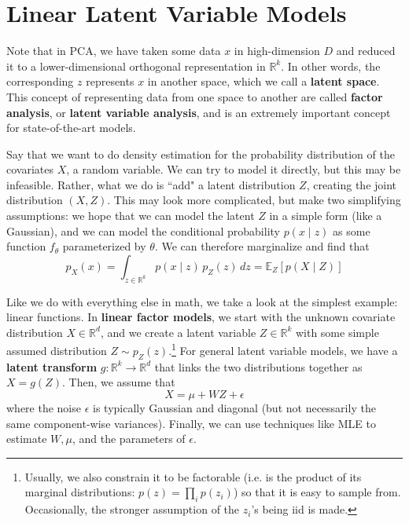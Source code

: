 \section{Linear Latent Variable Models}

  Note that in PCA, we have taken some data $x$ in high-dimension $D$ and reduced it to a lower-dimensional orthogonal representation in $\mathbb{R}^k$. In other words, the corresponding $z$ represents $x$ in another space, which we call a \textbf{latent space}. This concept of representing data from one space to another are called \textbf{factor analysis}, or \textbf{latent variable analysis}, and is an extremely important concept for state-of-the-art models. 

  Say that we want to do density estimation for the probability distribution of the covariates $X$, a random variable. We can try to model it directly, but this may be infeasible. Rather, what we do is ``add" a latent distribution $Z$, creating the joint distribution $(X, Z)$. This may look more complicated, but make two simplifying assumptions: we hope that we can model the latent $Z$ in a simple form (like a Gaussian), and we can model the conditional probability $p(x \mid z)$ as some function $f_\theta$ parameterized by $\theta$. We can therefore marginalize and find that 
  \begin{equation} 
    p_X (x) = \int_{z \in \mathbb{R}^k} p (x \mid z) \, p_Z (z) \,dz = \mathbb{E}_Z [p(X \mid Z)] 
  \end{equation}

  Like we do with everything else in math, we take a look at the simplest example: linear functions. In \textbf{linear factor models}, we start with the unknown covariate distribution $X \in \mathbb{R}^d$, and we create a latent variable $Z \in \mathbb{R}^k$ with some simple assumed distribution $Z \sim p_Z (z)$.\footnote{Usually, we also constrain it to be factorable (i.e. is the product of its marginal distributions: $p(z) = \prod_i p(z_i)$) so that it is easy to sample from. Occasionally, the stronger assumption of the $z_i$'s being iid is made.} For general latent variable models, we have a \textbf{latent transform} $g: \mathbb{R}^k \rightarrow \mathbb{R}^d$ that links the two distributions together as $X = g(Z)$. Then, we assume that 
  \begin{equation}
    X = \mu + W Z + \epsilon
  \end{equation}
  where the noise $\epsilon$ is typically Gaussian and diagonal (but not necessarily the same component-wise variances). Finally, we can use techniques like MLE to estimate $W, \mu$, and the parameters of $\epsilon$. 

